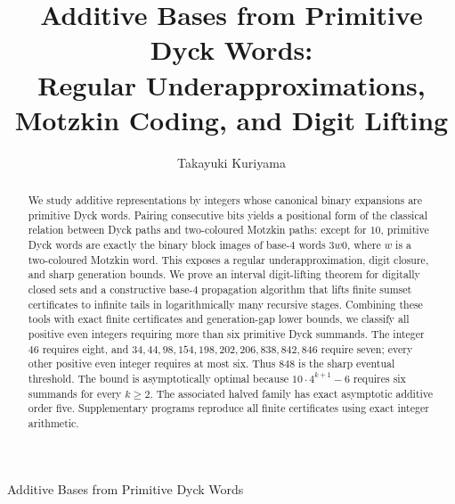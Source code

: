 \documentclass{ws-ijfcs}
\begin{document}
{Additive Bases from Primitive Dyck Words}

\catchline{}{}{}{}{}

\title{Additive Bases from Primitive Dyck Words:\\
Regular Underapproximations, Motzkin Coding, and Digit Lifting}

\author{Takayuki Kuriyama}

\address{Growup Learning Academy\\
4-8-3 Shakujii-machi, Nerima-ku, Tokyo 177-0041, Japan\\
}

\maketitle

\begin{abstract}
We study additive representations by integers whose canonical binary
expansions are primitive Dyck words.  Pairing consecutive bits yields a
positional form of the classical relation between Dyck paths and
two-coloured Motzkin paths: except for $10$, primitive Dyck words are
exactly the binary block images of base-$4$ words $3w0$, where $w$ is a
two-coloured Motzkin word.  This exposes a regular underapproximation,
digit closure, and sharp generation bounds.  We prove an interval
digit-lifting theorem for digitally closed sets and a constructive
base-$4$ propagation algorithm that lifts finite sumset certificates to
infinite tails in logarithmically many recursive stages.  Combining these
tools with exact finite certificates and generation-gap lower bounds, we
classify all positive even integers requiring more than six primitive Dyck
summands.  The integer $46$ requires eight, and
$34,44,98,154,198,202,206,838,842,846$ require seven; every other positive
even integer requires at most six.  Thus $848$ is the sharp eventual
threshold.  The bound is asymptotically optimal because
$10\cdot4^{k+1}-6$ requires six summands for every $k\geq2$.  The associated
halved family has exact asymptotic additive order five.  Supplementary
programs reproduce all finite certificates using exact integer arithmetic.
\end{abstract}

\end{document}
